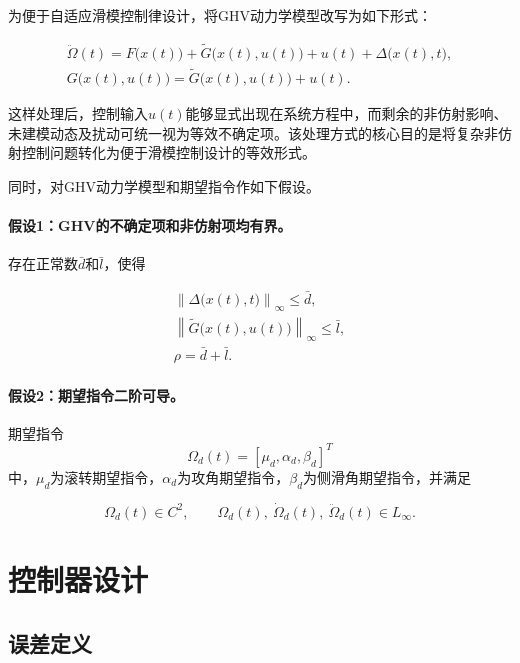 \documentclass[11pt,a4paper,UTF8]{ctexart}
\begin{document}
为便于自适应滑模控制律设计，将GHV动力学模型改写为如下形式：

\begin{equation}
\boxed{
\begin{gathered}
  \ddot{\Omega}(t)
  =F\bigl(x(t)\bigr)+\widetilde{G}\bigl(x(t),u(t)\bigr)+u(t)+\Delta\bigl(x(t),t\bigr),\\
  G\bigl(x(t),u(t)\bigr)
  =\widetilde{G}\bigl(x(t),u(t)\bigr)+u(t).
\end{gathered}
}
\end{equation}

这样处理后，控制输入$u(t)$能够显式出现在系统方程中，而剩余的非仿射影响、未建模动态及扰动可统一视为等效不确定项。该处理方式的核心目的是将复杂非仿射控制问题转化为便于滑模控制设计的等效形式。

同时，对GHV动力学模型和期望指令作如下假设。

\paragraph{假设1：GHV的不确定项和非仿射项均有界。}
存在正常数$\bar d$和$\bar l$，使得

\begin{equation}
\begin{gathered}
  \left\|\Delta\bigl(x(t),t\bigr)\right\|_{\infty}\leq \bar d,\\
  \left\|\widetilde{G}\bigl(x(t),u(t)\bigr)\right\|_{\infty}\leq \bar l,\\
  \rho=\bar d+\bar l.
\end{gathered}
\end{equation}

\paragraph{假设2：期望指令二阶可导。}
期望指令
\[
  \Omega_d(t)=\left[\mu_d,\alpha_d,\beta_d\right]^T
\]
中，$\mu_d$为滚转期望指令，$\alpha_d$为攻角期望指令，$\beta_d$为侧滑角期望指令，并满足

\begin{equation}
  \Omega_d(t)\in C^2,\qquad
  \Omega_d(t),\ \dot{\Omega}_d(t),\ \ddot{\Omega}_d(t)\in L_{\infty}.
\end{equation}

\section{控制器设计}

\subsection{误差定义}
\end{document}
